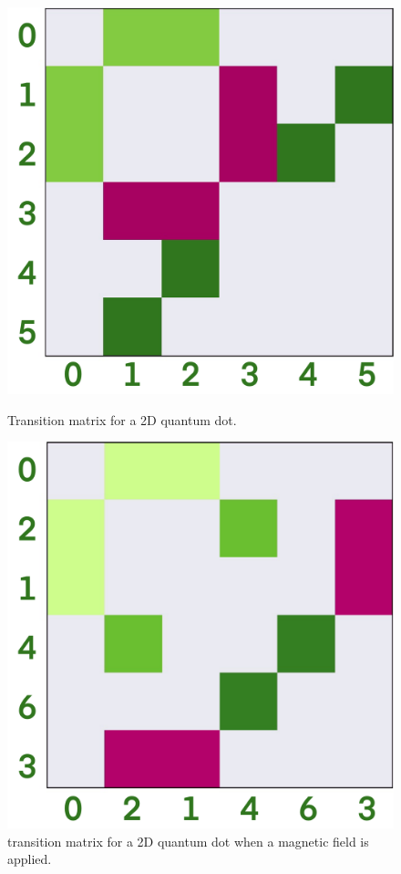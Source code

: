 \begin{figure}
    \begin{center}
    \begin{minipage}{0.4\textwidth}
        \centering
        \includegraphics[width=\textwidth]{results/figures/dipole_no_b.png}
        \caption{Transition matrix for a 2D quantum dot.}
        \label{fig:transition_no_b}
    \end{minipage}
    \begin{minipage}{0.4\textwidth}
        \includegraphics[width=\textwidth]{results/figures/dipole_yes_b.png}
        \caption{transition matrix for a 2D quantum dot when a magnetic field
            is applied.}
        \label{fig:transition_yes_b}
    \end{minipage}        
    \end{center}
\end{figure}

